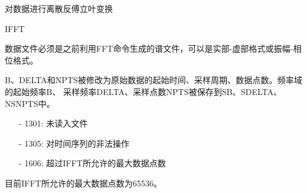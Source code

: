 \label{cmd:ifft}

对数据进行离散反傅立叶变换

\begin{SACSTX}
IFFT
\end{SACSTX}

数据文件必须是之前利用FFT命令生成的谱文件，可以是实部-虚部格式或振幅-相位格式。

B、DELTA和NPTS被修改为原始数据的起始时间、采样周期、数据点数。频率域的起始频率B、
采样频率DELTA、采样点数NPTS被保存到SB、SDELTA、NSNPTS中。

\begin{itemize}
\item[-]1301: 未读入文件
\item[-]1305: 对时间序列的非法操作
\item[-]1606: 超过IFFT所允许的最大数据点数
\end{itemize}

目前IFFT所允许的最大数据点数为65536。

